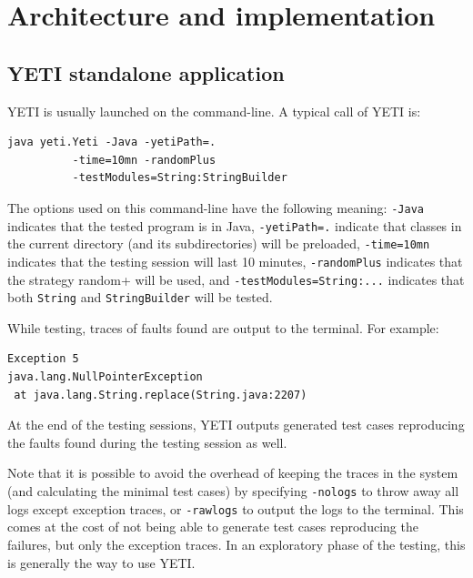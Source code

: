 \section{Architecture and implementation}\label{sec:architecture}

\subsection{YETI standalone application}
YETI is usually launched on the command-line. A typical call of YETI is:
{\small
\begin{verbatim}
java yeti.Yeti -Java -yetiPath=. 
          -time=10mn -randomPlus
          -testModules=String:StringBuilder 
\end{verbatim}
}

The options used on this command-line have the following meaning: \texttt{-Java} 
indicates that the tested program is in Java, \texttt{-yetiPath=.} indicate that 
classes in the current directory (and its subdirectories) will be preloaded, 
\texttt{-time=10mn} indicates that the testing session will last 10 minutes, 
\texttt{-randomPlus} indicates that the strategy random+ will be used, and 
\texttt{-testModules=String:...} indicates that 
both \texttt{String} and \texttt{StringBuilder} will be tested.

While testing, traces of faults found are output to the terminal. For example:

{\small
\begin{verbatim}
Exception 5
java.lang.NullPointerException
 at java.lang.String.replace(String.java:2207)
\end{verbatim}
}

At the end of the testing sessions, YETI outputs generated test cases reproducing 
the faults found during the testing session as well.

Note that it is possible to avoid the overhead of keeping the 
traces in the system (and calculating the minimal test cases) by specifying 
\texttt{-nologs} to throw away all logs except exception traces, or 
\texttt{-rawlogs} to output the logs to the terminal. This comes at the cost of
not being able to generate test cases reproducing the failures, but only the 
exception traces. In an exploratory phase of the testing, this is generally the
way to use YETI.



